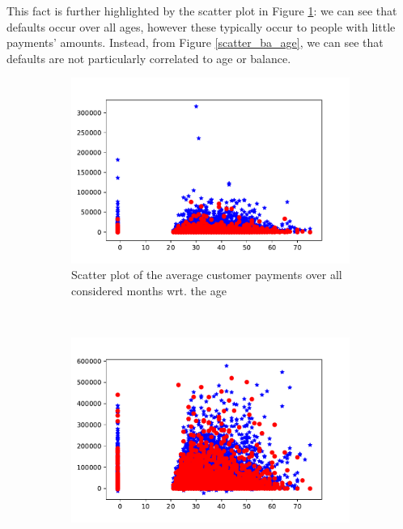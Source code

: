 \documentclass[a4paper]{article}
\begin{document}
\begin{enumerate}
\begin{center}
\begin{figure}
\end{figure}
\end{center}

This fact is further highlighted by the scatter plot in Figure \ref{scatter_pa_age}: we can see that defaults occur over all ages, however these typically occur to people with little payments' amounts. Instead, from Figure \ref{scatter_ba_age}, we can see that defaults are not particularly correlated to age or balance. 


\begin{figure}
    \centering
    \begin{subfigure}[b]{0.4\textwidth}
        \includegraphics[width=\textwidth]{../Code/Daniele/Plots/scatter_plot_age_pa.pdf}
        \caption{Scatter plot of the average customer payments over all considered months wrt. the age}
        \label{scatter_pa_age}
    \end{subfigure}
    ~ %
    \begin{subfigure}[b]{0.4\textwidth}
        \includegraphics[width=\textwidth]{../Code/Daniele/Plots/scatter_plot_age_ba.pdf}

\end{subfigure}
\end{figure}
\end{enumerate}
\end{document}
